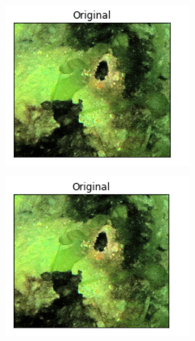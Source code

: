 \documentclass[10pt, a4paper]{article}
\begin{document}
\begin{figure}[H]	
	\centering
    \begin{subfigure}{0.3\textwidth}
        \includegraphics[width=0.9\textwidth]{1906ax-k2.png}
    \end{subfigure}\hfill
    	\centering
    \begin{subfigure}{0.3\textwidth}
        \includegraphics[width=0.9\textwidth]{1906ax-k4.png}
    \end{subfigure}\hfill	
    \centering
    \begin{subfigure}{0.3\textwidth}

\end{subfigure}
\end{figure}
\end{document}
